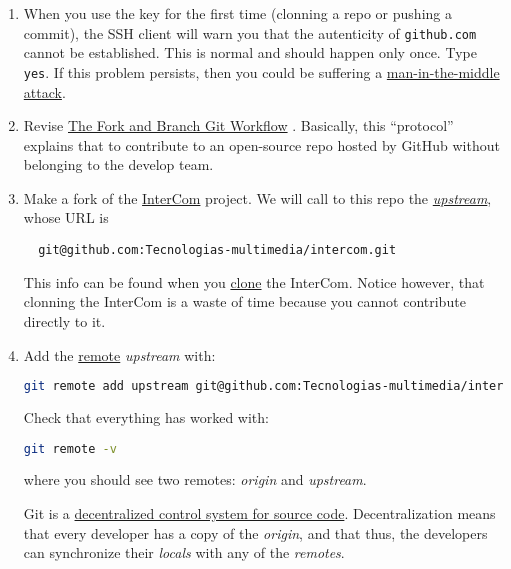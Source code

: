 \begin{enumerate}
\item When you use the key for the first time (clonning a repo or
  pushing a commit), the SSH client will warn you that the autenticity
  of \texttt{github.com} cannot be established. This is normal and
  should happen only once. Type \texttt{yes}. If this problem
  persists, then you could be suffering a
  \href{https://en.wikipedia.org/wiki/Man-in-the-middle_attack}{man-in-the-middle
    attack}.

\item Revise
  \href{https://github.com/vicente-gonzalez-ruiz/fork_and_branch_git_workflow}{The
    Fork and Branch Git Workflow} \cite{Git-workflow}. Basically, this
  ``protocol'' explains that to contribute to an open-source repo
  hosted by GitHub without belonging to the develop team.

\item Make a fork of the
  \href{https://github.com/Tecnologias-multimedia/intercom}{InterCom}
  project. We will call to this repo the
  \href{https://docs.github.com/en/github/getting-started-with-github/github-glossary#upstream}{\emph{upstream}}, whose URL is
\begin{verbatim}
  git@github.com:Tecnologias-multimedia/intercom.git
\end{verbatim}        
  This info can be found when you
  \href{https://docs.github.com/en/github/creating-cloning-and-archiving-repositories/cloning-a-repository}{clone}
  the InterCom. Notice however, that clonning the InterCom is a waste
  of time because you cannot contribute directly to it.

\item Add the
  \href{https://docs.github.com/en/github/getting-started-with-github/github-glossary#remote}{remote}
  \emph{upstream} with:

  \begin{lstlisting}[language=bash]
    git remote add upstream git@github.com:Tecnologias-multimedia/intercom.git
  \end{lstlisting}

  Check that everything has worked with:

  \begin{lstlisting}[language=bash]  
    git remote -v
  \end{lstlisting}

  where you should see two remotes: \emph{origin} and \emph{upstream}.

  Git is
  a \href{https://nvie.com/posts/a-successful-git-branching-model/}{decentralized
  control system for source code}. Decentralization means that every
  developer has a copy of the \emph{origin}, and that thus, the
  developers can synchronize their \emph{locals} with any of
  the \emph{remotes}.

\end{enumerate}

